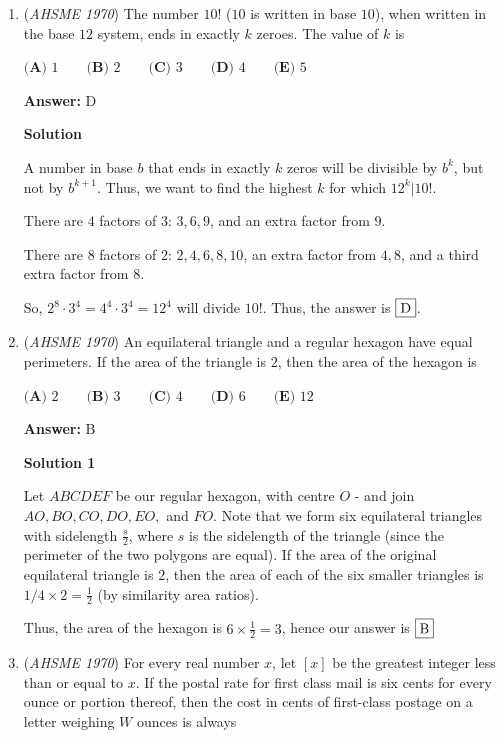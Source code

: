 \begin{enumerate}
 
$\sim$Melkor

 


	\item (\textit{AHSME 1970}) The number $10!$ ($10$ is written in base $10$), when written in the base $12$ system, ends in exactly $k$ zeroes. The value of $k$ is


 $\textbf{(A) }1\qquad \textbf{(B) }2\qquad \textbf{(C) }3\qquad \textbf{(D) }4\qquad  \textbf{(E) } 5$

 \textbf{Answer: }D



\textbf{Solution}

A number in base $b$ that ends in exactly $k$ zeros will be divisible by $b^k$, but not by $b^{k+1}$.  Thus, we want to find the highest $k$ for which $12^k | 10!$.

 There are $4$ factors of $3$:  $3, 6, 9$, and an extra factor from $9$.

 There are $8$ factors of $2$:  $2, 4, 6, 8, 10$, an extra factor from $4, 8$, and a third extra factor from $8$.

 So, $2^8 \cdot 3^4 = 4^4 \cdot 3^4 = 12^4$ will divide $10!$.  Thus, the answer is $\fbox{D}$.

 


	\item (\textit{AHSME 1970}) An equilateral triangle and a regular hexagon have equal perimeters. If the area of the triangle is $2$, then the area of the hexagon is


 $\textbf{(A) }2\qquad \textbf{(B) }3\qquad \textbf{(C) }4\qquad \textbf{(D) }6\qquad  \textbf{(E) }12$

 \textbf{Answer: }B



\textbf{Solution 1}

Let $ABCDEF$ be our regular hexagon, with centre $O$ - and join $AO, BO, CO, DO, EO,$ and $FO$. Note that we form six equilateral triangles with sidelength $\frac{s}{2}$, where $s$ is the sidelength of the triangle (since the perimeter of the two polygons are equal). If the area of the original equilateral triangle is $2$, then the area of each of the six smaller triangles is $1/4\times 2 = \frac{1}{2}$ (by similarity area ratios). 

 Thus, the area of the hexagon is $6\times \frac{1}{2}=3$, hence our answer is $\fbox{B}$



	\item (\textit{AHSME 1970}) For every real number $x$, let $[x]$ be the greatest integer less than or equal to $x$. 
If the postal rate for first class mail is six cents for every ounce or portion thereof, 
then the cost in cents of first-class postage on a letter weighing $W$ ounces is always



\end{enumerate}
